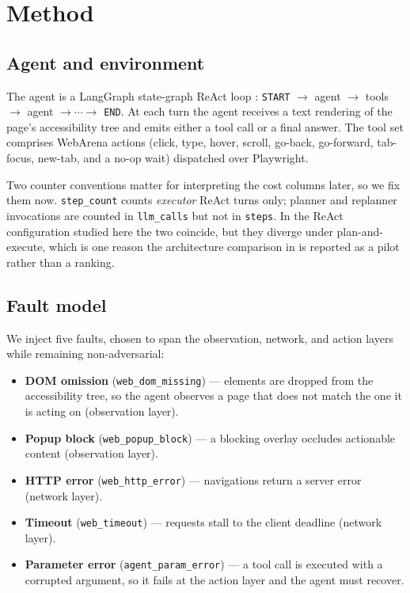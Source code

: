 \section{Method}
\label{sec:method}

\subsection{Agent and environment}
\label{sec:agent}

The agent is a LangGraph state-graph ReAct loop
\citep{yao2023react, langgraph2024}: \texttt{START} $\rightarrow$ agent
$\rightarrow$ tools $\rightarrow$ agent $\rightarrow \cdots \rightarrow$
\texttt{END}. At each turn the agent receives a text rendering of the page's
accessibility tree and emits either a tool call or a final answer. The tool set
comprises \ToolCount{} WebArena actions (click, type, hover, scroll, go-back,
go-forward, tab-focus, new-tab, and a no-op wait) dispatched over Playwright.

Two counter conventions matter for interpreting the cost columns later, so we fix
them now. \texttt{step\_count} counts \emph{executor} ReAct turns only;
planner and replanner invocations are counted in \texttt{llm\_calls} but not in
\texttt{steps}. In the ReAct configuration studied here the two coincide, but
they diverge under plan-and-execute, which is one reason the architecture
comparison in  is reported as a pilot rather than a ranking.

\subsection{Fault model}
\label{sec:faults}

We inject five faults, chosen to span the observation, network, and action
layers while remaining non-adversarial:

\begin{itemize}
  \item \textbf{DOM omission} (\texttt{web\_dom\_missing}) --- elements are dropped
  from the accessibility tree, so the agent observes a page that does not match
  the one it is acting on (observation layer).
  \item \textbf{Popup block} (\texttt{web\_popup\_block}) --- a blocking overlay
  occludes actionable content (observation layer).
  \item \textbf{HTTP error} (\texttt{web\_http\_error}) --- navigations return a
  server error (network layer).
  \item \textbf{Timeout} (\texttt{web\_timeout}) --- requests stall to the client
  deadline (network layer).
  \item \textbf{Parameter error} (\texttt{agent\_param\_error}) --- a tool call is
  executed with a corrupted argument, so it fails at the action layer and the
  agent must recover.
\end{itemize}

